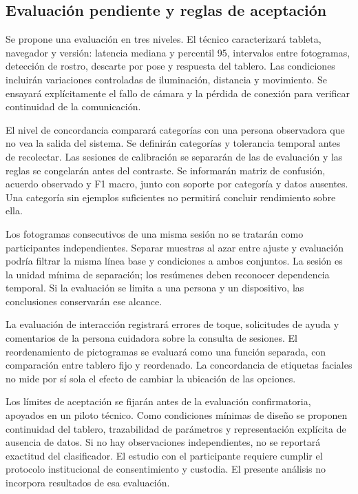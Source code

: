 \documentclass[conference,letterpaper]{IEEEtran}
\begin{document}
\subsection{Evaluación pendiente y reglas de aceptación}
Se propone una evaluación en tres niveles. El técnico caracterizará tableta, navegador y versión: latencia mediana y percentil 95, intervalos entre fotogramas, detección de rostro, descarte por pose y respuesta del tablero. Las condiciones incluirán variaciones controladas de iluminación, distancia y movimiento. Se ensayará explícitamente el fallo de cámara y la pérdida de conexión para verificar continuidad de la comunicación.

El nivel de concordancia comparará categorías con una persona observadora que no vea la salida del sistema. Se definirán categorías y tolerancia temporal antes de recolectar. Las sesiones de calibración se separarán de las de evaluación y las reglas se congelarán antes del contraste. Se informarán matriz de confusión, acuerdo observado y F1 macro, junto con soporte por categoría y datos ausentes. Una categoría sin ejemplos suficientes no permitirá concluir rendimiento sobre ella.

Los fotogramas consecutivos de una misma sesión no se tratarán como participantes independientes. Separar muestras al azar entre ajuste y evaluación podría filtrar la misma línea base y condiciones a ambos conjuntos. La sesión es la unidad mínima de separación; los resúmenes deben reconocer dependencia temporal. Si la evaluación se limita a una persona y un dispositivo, las conclusiones conservarán ese alcance.

La evaluación de interacción registrará errores de toque, solicitudes de ayuda y comentarios de la persona cuidadora sobre la consulta de sesiones. El reordenamiento de pictogramas se evaluará como una función separada, con comparación entre tablero fijo y reordenado. La concordancia de etiquetas faciales no mide por sí sola el efecto de cambiar la ubicación de las opciones.

Los límites de aceptación se fijarán antes de la evaluación confirmatoria, apoyados en un piloto técnico. Como condiciones mínimas de diseño se proponen continuidad del tablero, trazabilidad de parámetros y representación explícita de ausencia de datos. Si no hay observaciones independientes, no se reportará exactitud del clasificador. El estudio con el participante requiere cumplir el protocolo institucional de consentimiento y custodia. El presente análisis no incorpora resultados de esa evaluación.
\end{document}
